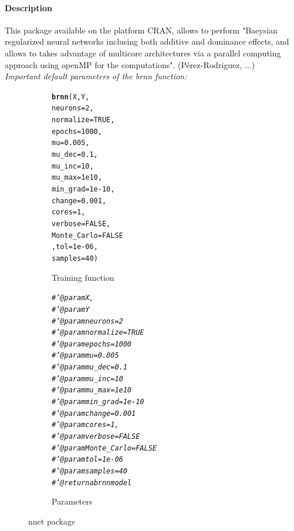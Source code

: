 \documentclass[letter]{article}\usepackage[]{graphicx}\usepackage[]{color}
\makeatletter
\newcommand{\hlnum}[1]{\textcolor[rgb]{0.686,0.059,0.569}{#1}}%
\newcommand{\hlcom}[1]{\textcolor[rgb]{0.678,0.584,0.686}{\textit{#1}}}%
\newcommand{\hlstd}[1]{\textcolor[rgb]{0.345,0.345,0.345}{#1}}%
\newcommand{\hlkwc}[1]{\textcolor[rgb]{0.333,0.667,0.333}{#1}}%
\newcommand{\hlkwd}[1]{\textcolor[rgb]{0.737,0.353,0.396}{\textbf{#1}}}%
\newenvironment{kframe}{%
 \def\at@end@of@kframe{}%
 \ifinner\ifhmode%
  \def\at@end@of@kframe{\end{minipage}}%
  \begin{minipage}{\columnwidth}%
 \fi\fi%
 \def\FrameCommand##1{\hskip\@totalleftmargin \hskip-\fboxsep
 \colorbox{shadecolor}{##1}\hskip-\fboxsep
     \hskip-\linewidth \hskip-\@totalleftmargin \hskip\columnwidth}%
 \MakeFramed {\advance\hsize-\width
   \@totalleftmargin\z@ \linewidth\hsize
   \@setminipage}}%
 {\par\unskip\endMakeFramed%
 \at@end@of@kframe}
\newenvironment{knitrout}{}{} %
\makeatother
\begin{document}
\paragraph{Description}
This package available on the platform CRAN, allows to perform "Baeysian regularized neural networks inclusing both additive and dominance effects, and allows to takes advantage of multicore architectures via a parallel computing approach using openMP for the computations". (Pérez-Rodriguez, ...)\\
\textit{Important default parameters of the brnn function:}
\begin{figure}[H]
  \begin{subfigure}{0.5\textwidth}
\begin{knitrout}
\color{fgcolor}\begin{kframe}
\begin{alltt}
\hlkwd{brnn}\hlstd{(X,Y,}
      \hlkwc{neurons}\hlstd{=}\hlnum{2}\hlstd{,}
      \hlkwc{normalize}\hlstd{=}\hlnum{TRUE}\hlstd{,}
      \hlkwc{epochs}\hlstd{=}\hlnum{1000}\hlstd{,}
      \hlkwc{mu}\hlstd{=}\hlnum{0.005}\hlstd{,}
      \hlkwc{mu_dec}\hlstd{=}\hlnum{0.1}\hlstd{,}
      \hlkwc{mu_inc}\hlstd{=}\hlnum{10}\hlstd{,}
      \hlkwc{mu_max}\hlstd{=}\hlnum{1e10}\hlstd{,}
      \hlkwc{min_grad}\hlstd{=}\hlnum{1e-10}\hlstd{,}
      \hlkwc{change} \hlstd{=} \hlnum{0.001}\hlstd{,}
      \hlkwc{cores}\hlstd{=}\hlnum{1}\hlstd{,}
      \hlkwc{verbose}\hlstd{=}\hlnum{FALSE}\hlstd{,}
      \hlkwc{Monte_Carlo} \hlstd{=} \hlnum{FALSE}
      \hlstd{,}\hlkwc{tol} \hlstd{=} \hlnum{1e-06}\hlstd{,}
      \hlkwc{samples} \hlstd{=} \hlnum{40}\hlstd{)}
\end{alltt}
\end{kframe}
\end{knitrout}
    \caption{Training function}
  \end{subfigure}
  \begin{subfigure}{0.5\textwidth}
    \centering
\begin{knitrout}
\color{fgcolor}\begin{kframe}
\begin{alltt}
\hlcom{#' @param X,}
\hlcom{#' @param Y}
\hlcom{#' @param neurons=2}
\hlcom{#' @param normalize=TRUE}
\hlcom{#' @param epochs=1000}
\hlcom{#' @param mu=0.005}
\hlcom{#' @param mu_dec=0.1}
\hlcom{#' @param mu_inc=10}
\hlcom{#' @param mu_max=1e10}
\hlcom{#' @param min_grad=1e-10}
\hlcom{#' @param change = 0.001}
\hlcom{#' @param cores=1,}
\hlcom{#' @param verbose=FALSE}
\hlcom{#' @param Monte_Carlo = FALSE}
\hlcom{#' @param tol = 1e-06}
\hlcom{#' @param samples = 40}
\hlcom{#' @return a brnn model}
\end{alltt}
\end{kframe}
\end{knitrout}
    \caption{Parameters}
  \end{subfigure}
    \caption{nnet package}
\end{figure}
\end{document}
